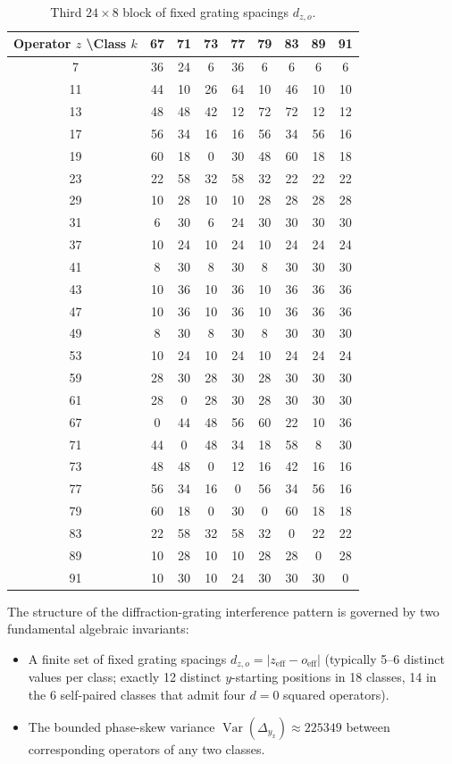 \documentclass[11pt,a4paper]{article}
\begin{document}
\begin{table}[htbp]
\centering
\tiny
\begin{tabular}{c|cccccccc}
Operator \(z\) \textbackslash Class \(k\) & 67 & 71 & 73 & 77 & 79 & 83 & 89 & 91 \\
\hline
7  & 36 & 24 & 6 & 36 & 6 & 6 & 6 & 6 \\
11 & 44 & 10 & 26 & 64 & 10 & 46 & 10 & 10 \\
13 & 48 & 48 & 42 & 12 & 72 & 72 & 12 & 12 \\
17 & 56 & 34 & 16 & 16 & 56 & 34 & 56 & 16 \\
19 & 60 & 18 & 0 & 30 & 48 & 60 & 18 & 18 \\
23 & 22 & 58 & 32 & 58 & 32 & 22 & 22 & 22 \\
29 & 10 & 28 & 10 & 10 & 28 & 28 & 28 & 28 \\
31 & 6 & 30 & 6 & 24 & 30 & 30 & 30 & 30 \\
37 & 10 & 24 & 10 & 24 & 10 & 24 & 24 & 24 \\
41 & 8 & 30 & 8 & 30 & 8 & 30 & 30 & 30 \\
43 & 10 & 36 & 10 & 36 & 10 & 36 & 36 & 36 \\
47 & 10 & 36 & 10 & 36 & 10 & 36 & 36 & 36 \\
49 & 8 & 30 & 8 & 30 & 8 & 30 & 30 & 30 \\
53 & 10 & 24 & 10 & 24 & 10 & 24 & 24 & 24 \\
59 & 28 & 30 & 28 & 30 & 28 & 30 & 30 & 30 \\
61 & 28 & 0 & 28 & 30 & 28 & 30 & 30 & 30 \\
67 & 0 & 44 & 48 & 56 & 60 & 22 & 10 & 36 \\
71 & 44 & 0 & 48 & 34 & 18 & 58 & 8 & 30 \\
73 & 48 & 48 & 0 & 12 & 16 & 42 & 16 & 16 \\
77 & 56 & 34 & 16 & 0 & 56 & 34 & 56 & 16 \\
79 & 60 & 18 & 0 & 30 & 0 & 60 & 18 & 18 \\
83 & 22 & 58 & 32 & 58 & 32 & 0 & 22 & 22 \\
89 & 10 & 28 & 10 & 10 & 28 & 28 & 0 & 28 \\
91 & 10 & 30 & 10 & 24 & 30 & 30 & 30 & 0 \\
\end{tabular}
\caption{Third \(24 \times 8\) block of fixed grating spacings \(d_{z,o}\).}
\label{tab:d-block3}
\end{table}

The structure of the diffraction-grating interference pattern is governed by two fundamental algebraic invariants:
\begin{itemize}
\item A finite set of fixed grating spacings \(d_{z,o}=|z_{\mathrm{eff}}-o_{\mathrm{eff}}|\) (typically 5--6 distinct values per class; exactly 12 distinct \(y\)-starting positions in 18 classes, 14 in the 6 self-paired classes that admit four \(d=0\) squared operators).
\item The bounded phase-skew variance \(\operatorname{Var}(\Delta_{y_x})\approx225349\) between corresponding operators of any two classes.
\end{itemize}
\end{document}
